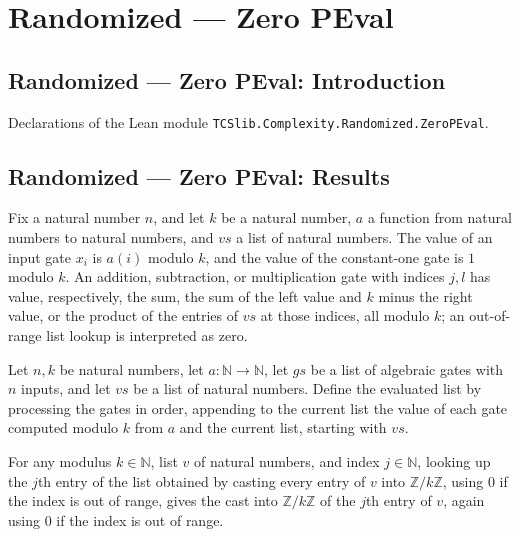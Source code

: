 \section{Randomized --- Zero PEval}
\subsection*{Randomized --- Zero PEval: Introduction}

Declarations of the Lean module \texttt{TCSlib.Complexity.Randomized.ZeroPEval}.

\subsection*{Randomized --- Zero PEval: Results}

\begin{definition}
\label{Randomized.PIT.gateVal}
\leanok
{}
Fix a natural number $n$, and let $k$ be a natural number, $a$ a function from natural
numbers to natural numbers, and $vs$ a list of natural numbers. The value of an input
gate $x_i$ is $a(i)$ modulo $k$, and the value of the constant-one gate is $1$ modulo
$k$. An addition, subtraction, or multiplication gate with indices $j,l$ has value,
respectively, the sum, the sum of the left value and $k$ minus the right value, or the
product of the entries of $vs$ at those indices, all modulo $k$; an out-of-range list
lookup is interpreted as zero.
\end{definition}

\begin{definition}
\label{Randomized.PIT.evalVals}
\leanok
{}
Let $n,k$ be natural numbers, let $a:\mathbb N\to\mathbb N$, let $gs$ be a list of
algebraic gates with $n$ inputs, and let $vs$ be a list of natural numbers. Define the
evaluated list by processing the gates in order, appending to the current list the value
of each gate computed modulo $k$ from $a$ and the current list, starting with $vs$.
\end{definition}

\begin{theorem}
\label{Randomized.PIT.getD_map_natCast}
\leanok
{}
For any modulus $k\in\mathbb{N}$, list $v$ of natural numbers, and index
$j\in\mathbb{N}$, looking up the $j$th entry of the list obtained by casting every entry
of $v$ into $\mathbb{Z}/k\mathbb{Z}$, using $0$ if the index is out of range, gives the
cast into $\mathbb{Z}/k\mathbb{Z}$ of the $j$th entry of $v$, again using $0$ if the
index is out of range.
\end{theorem}

